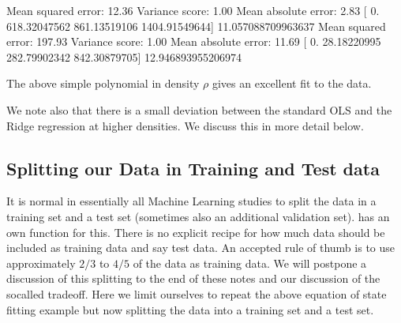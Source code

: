 \documentclass[letterpaper,10pt,english]{sphinxmanual}
\begin{document}
\begin{sphinxVerbatim}[commandchars=\\\{\}]
Mean squared error: 12.36
Variance score: 1.00
Mean absolute error: 2.83
[   0.          618.32047562 \PYGZhy{}861.13519106 1404.91549644] \PYGZhy{}11.057088709963637
Mean squared error: 197.93
Variance score: 1.00
Mean absolute error: 11.69
[  0.          28.18220995 282.79902342 842.30879705] 12.946893955206974
\end{sphinxVerbatim}

\noindent{}

The above simple polynomial in density \(\rho\) gives an excellent fit
to the data.

We note also that there is a small deviation between the
standard OLS and the Ridge regression at higher densities. We discuss this in more detail
below.


\subsection{Splitting our Data in Training and Test data}
\label{\detokenize{chapter4:splitting-our-data-in-training-and-test-data}}
It is normal in essentially all Machine Learning studies to split the
data in a training set and a test set (sometimes also an additional
validation set).   has an own function for this. There
is no explicit recipe for how much data should be included as training
data and say test data.  An accepted rule of thumb is to use
approximately \(2/3\) to \(4/5\) of the data as training data. We will
postpone a discussion of this splitting to the end of these notes and
our discussion of the so\sphinxhyphen{}called  tradeoff. Here we
limit ourselves to repeat the above equation of state fitting example
but now splitting the data into a training set and a test set.
\end{document}
